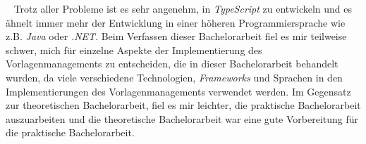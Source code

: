 \ \newline
Trotz aller Probleme ist es sehr angenehm, in \emph{TypeScript} zu entwickeln und es ähnelt immer mehr der Entwicklung in einer höheren Programmiersprache wie z.B. \emph{Java} oder \emph{.NET}.
\newline
\newline
Beim Verfassen dieser Bachelorarbeit fiel es mir teilweise schwer, mich für einzelne Aspekte der Implementierung des Vorlagenmanagements zu entscheiden, die in dieser Bachelorarbeit behandelt wurden, da viele verschiedene Technologien, \emph{Frameworks} und Sprachen in den Implementierungen des Vorlagenmanagements verwendet werden. Im Gegensatz zur theoretischen Bachelorarbeit, fiel es mir leichter, die praktische Bachelorarbeit auszuarbeiten und die theoretische Bachelorarbeit war eine gute Vorbereitung für die praktische Bachelorarbeit.